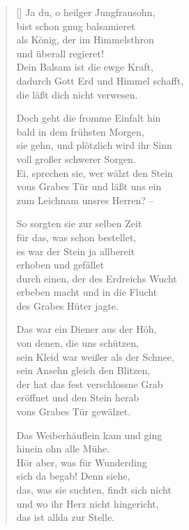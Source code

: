\begin{multicols}{2}
\begin{verse}[\versewidth]
 Ja du, o heilger Jungfrausohn,\\
bist schon gnug balsamieret\\
als König, der im Himmelsthron\\
und überall regieret!\\
Dein Balsam ist die ewge Kraft,\\
dadurch Gott Erd und Himmel schafft,\\
die läßt dich nicht verwesen.

 Doch geht die fromme Einfalt hin\\
bald in dem frühsten Morgen,\\
sie gehn, und plötzlich wird ihr Sinn\\
voll großer schwerer Sorgen.\\
Ei, sprechen sie, wer wälzt den Stein\\
vons Grabes Tür und läßt uns ein\\
zum Leichnam unsres Herren? –

 So sorgten sie zur selben Zeit\\
für das, was schon bestellet,\\
es war der Stein ja allbereit\\
erhoben und gefället\\
durch einen, der des Erdreichs Wucht\\
erbeben macht und in die Flucht\\
des Grabes Hüter jagte.

 Das war ein Diener aus der Höh,\\
von denen, die uns schützen,\\
sein Kleid war weißer als der Schnee,\\
sein Ansehn gleich den Blitzen,\\
der hat das fest verschlossne Grab\\
eröffnet und den Stein herab\\
vons Grabes Tür gewälzet.

 Das Weiberhäuflein kam und ging\\
hinein ohn alle Mühe.\\
Hör aber, was für Wunderding\\
sich da begab! Denn siehe,\\
das, was sie suchten, findt sich nicht\\
und wo ihr Herz nicht hingericht,\\
das ist allda zur Stelle.


\end{verse}
\end{multicols}
